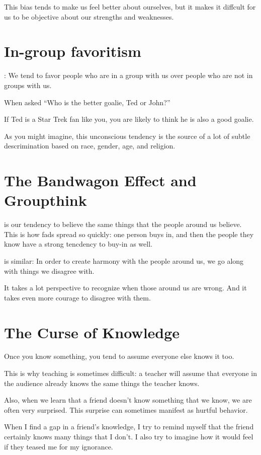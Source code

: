 This bias tends to make us feel better about ourselves, but it makes it
diffcult for us to be objective about our strengths and weaknesses.

\section{In-group favoritism}

: We tend to favor people who are in
a group with us over people who are not in groups with us.

When asked ``Who is the better goalie, Ted or John?''

If Ted is a Star Trek fan like you, you are likely to think he is also
a good goalie.

As you might imagine, this unconscious tendency is the source of a lot
of subtle descrimination based on race, gender, age, and religion.

\section{The Bandwagon Effect and Groupthink}

 is our tendency to believe the same
things that the people around us believe. This is how fads spread so
quickly: one person buys in, and then the people they know have a
strong tencdency to buy-in as well.

 is similar: In order to create harmony with the
people around us, we go along with things we disagree with.

It takes a lot perspective to recognize when those around us are
wrong. And it takes even more courage to disagree with them.

\section{The Curse of Knowledge}

Once you know something, you tend to assume everyone else knows it too.

This is why teaching is sometimes difficult: a teacher will assume
that everyone in the audience already knows the same things the
teacher knows.

Also, when we learn that a friend doesn't know something that we know,
we are often very surprised.  This surprise can sometimes manifest as
hurtful behavior.

When I find a gap in a friend's knowledge, I try to remind myself that
the friend certainly knows many things that I don't.  I also try to
imagine how it would feel if they teased me for my ignorance.

